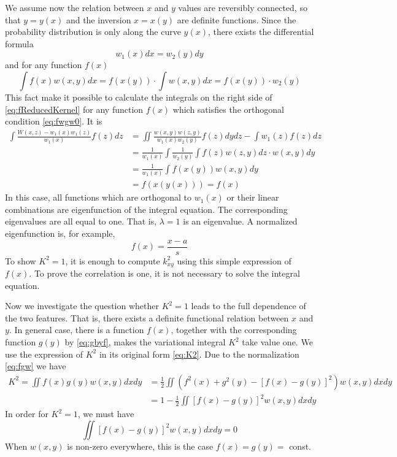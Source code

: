 \documentclass{article}
\begin{document}
We assume now the relation between
$x$ and $y$ values are reversibly connected, so that
$y=y(x)$ and the inversion $x=x(y)$ are definite functions.
Since the probability distribution  is only along
the curve $y(x)$, there exists the differential formula
$$
w_1(x) dx = w_2(y) dy
$$
and for any function $f(x)$
$$
\int f(x) w(x,y)dx = f(x(y)) \cdot \int w(x,y) dx
= f(x(y)) \cdot w_2(y)
$$
This fact make it possible to calculate the integrals on the right side of
\eqref{eq:fReducedKernel} for any function $f(x)$ which satisfies
the orthogonal condition \eqref{eq:fwgw0}. It is
\begin{align*}
    \int \frac{W(x,z) - w_1(x) w_1(z)}{w_1(x)} f(z)dz
    &= \iint  \frac{w(x,y)w(z,y)}{w_1(x)w_2(y)} f(z) dydz- \int w_1(z) f(z)dz \\
    &= \frac{1}{w_1(x)} \int \frac{1}{w_2(y)}\int f(z)w(z,y)dz\cdot w(x,y)dy\\
    &= \frac{1}{w_1(x)} \int f(x(y)) w(x,y)dy \\
    &= f(x(y(x))) = f(x)
\end{align*}
In this case, all functions which are orthogonal to $w_1(x)$ or their
linear combinations
are eigenfunction of the integral equation.
The corresponding eigenvalues are all equal to one.
That is, $\lambda = 1$ is an eigenvalue.
A normalized eigenfunction is, for example,
$$
f(x) = \frac{x-a}{s}
$$
To show $K^2=1$, it is enough to compute $k^2_{xy}$
using this simple expression of $f(x)$.
To prove the correlation is one, it is not necessary to solve the integral equation.

Now we investigate the question whether $K^2=1$
leads to the full dependence of the two features.
That is, there exists a definite functional relation
between $x$ and $y$. In general case, there is a function
$f(x)$, together with the corresponding function $g(y)$
by \eqref{eq:gbyf}, makes the variational integral $K^2$
take value one. We use the expression of $K^2$ in its
original form \eqref{eq:K2}. Due to the normalization
\eqref{eq:fgw} we have
\begin{align*}
K^2 = \iint f(x)g(y) w(x,y)dxdy
&= \frac{1}{2} \iint (f^2(x) + g^2(y) - 
[f(x) - g(y)]^2) w(x,y) dxdy \\
& = 1 - \frac{1}{2} \iint [f(x) - g(y)]^2 w(x,y) dxdy
\end{align*}
In order for $K^2=1$,
we must have
\begin{equation}
    \iint [f(x) - g(y)]^2 w(x,y)dxdy=0
\end{equation}
When $w(x,y)$ is non-zero everywhere, this is the case $f(x)=g(y)=$ const.
\end{document}
